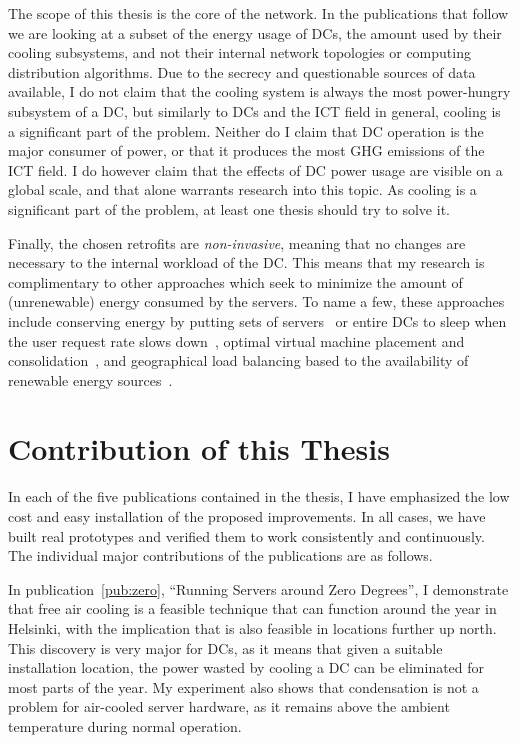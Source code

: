 \documentclass[officiallayout]{tktla}
\begin{document}
The scope of this thesis is the core of the network. In the publications that
follow we are looking at a subset of the energy usage of DCs, the amount used
by their cooling subsystems, and not their internal network topologies or
computing distribution algorithms. Due to the secrecy and questionable sources
of data available, I do not claim that the cooling system is always the most
power-hungry subsystem of a DC, but similarly to DCs and the ICT field in
general, cooling is a significant part of the problem.  Neither do I claim
that DC operation is the major consumer of power, or that it produces the most
GHG emissions of the ICT field. I do however claim that the effects of DC
power usage are visible on a global scale, and that alone warrants research
into this topic. As cooling is a significant part of the problem, at least one
thesis should try to solve it. 

Finally, the chosen retrofits are \emph{non-invasive}, meaning that no changes
are necessary to the internal workload of the DC. This means that my research
is complimentary to other approaches which seek to minimize the amount of
(unrenewable) energy consumed by the servers. To name a few, these approaches
include conserving energy by putting sets of servers~\cite{Sharma2011} or
entire DCs to sleep when the user request rate slows down~\cite{Liu2011b},
optimal virtual machine placement and consolidation~\cite{Liu2009}, and
geographical load balancing based to the availability of renewable energy
sources~\cite{Colajanni1998, Liu2011a}.


\section{Contribution of this Thesis}

In each of the five publications contained in the thesis, I have emphasized
the low cost and easy installation of the proposed improvements. In all cases,
we have built real prototypes and verified them to work consistently and
continuously. The individual major contributions of the publications are as
follows.

In publication~\ref{pub:zero}, ``Running Servers around Zero Degrees'', I
demonstrate that free air cooling is a feasible technique that can function
around the year in Helsinki, with the implication that is also feasible in
locations further up north. This discovery is very major for DCs, as it means
that given a suitable installation location, the power wasted by cooling a DC
can be eliminated for most parts of the year. My experiment also shows that
condensation is not a problem for air-cooled server hardware, as it remains
above the ambient temperature during normal operation.
\end{document}

